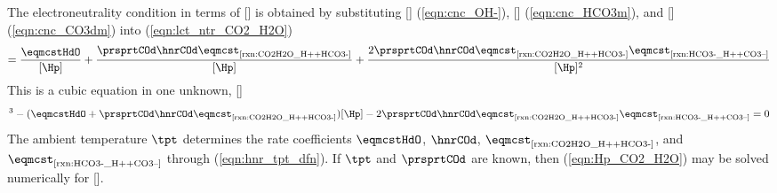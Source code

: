 \documentclass[12pt,twoside]{book}
\begin{document}
The electroneutrality condition in terms of [\Hp] is obtained by
substituting [\OH] (\ref{eqn:cnc_OH-}), [\HCOtm] (\ref{eqn:cnc_HCO3m}),
and [\COtdm] (\ref{eqn:cnc_CO3dm}) into (\ref{eqn:lct_ntr_CO2_H2O})  
\begin{equation}
[\Hp] = \frac{\eqmcstHdO}{[\Hp] } +
\frac{\prsprtCOd \hnrCOd \eqmcst_{\mbox{\scriptsize \ref{rxn:CO2H2O_H++HCO3-}}}}{[\Hp] } + 
\frac{2 \prsprtCOd \hnrCOd \eqmcst_{\mbox{\scriptsize \ref{rxn:CO2H2O_H++HCO3-}}}
\eqmcst_{\mbox{\scriptsize \ref{rxn:HCO3-_H++CO3--}}}}{[\Hp]^{2} }
\label{eqn:elc_ntr_eqn_CO2}
\end{equation}
This is a cubic equation in one unknown, [\Hp]
\begin{equation}
[\Hp]^{3} - ( \eqmcstHdO + \prsprtCOd \hnrCOd
\eqmcst_{\mbox{\scriptsize \ref{rxn:CO2H2O_H++HCO3-}}} ) [\Hp] -  
2 \prsprtCOd \hnrCOd \eqmcst_{\mbox{\scriptsize \ref{rxn:CO2H2O_H++HCO3-}}}
\eqmcst_{\mbox{\scriptsize \ref{rxn:HCO3-_H++CO3--}}} = 0
\label{eqn:Hp_CO2_H2O}
\end{equation}
The ambient temperature $\tpt$ determines the rate coefficients 
$\eqmcstHdO$, $\hnrCOd$, $\eqmcst_{\mbox{\scriptsize \ref{rxn:CO2H2O_H++HCO3-}}}$, and
$\eqmcst_{\mbox{\scriptsize \ref{rxn:HCO3-_H++CO3--}}}$ through (\ref{eqn:hnr_tpt_dfn}). 
If $\tpt$ and $\prsprtCOd$ are known, then (\ref{eqn:Hp_CO2_H2O}) 
may be solved numerically for [\Hp].
\end{document}
